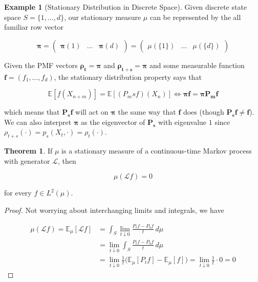 \documentclass{article}
\theoremstyle{definition}
\newtheorem{theorem}{Theorem}[section]
\newtheorem{example}{Example}[section]
\theoremstyle{remark}
\theoremstyle{definition}
\begin{document}
    \begin{example}[Stationary Distribution in Discrete Space]
      Given discrete state space $S = \{1, \ldots, d\}$, our stationary measure $\mu$ can be represented by the all familiar row vector 

        \[\boldsymbol{\pi} = \begin{pmatrix} \boldsymbol{\pi} (1) & \ldots & \boldsymbol{\pi} (d) \end{pmatrix} = \begin{pmatrix} \mu(\{1\}) & \ldots & \mu(\{d\}) \end{pmatrix}\] 

      Given the PMF vectors $\boldsymbol{\rho_t} = \boldsymbol{\pi}$ and $\boldsymbol{\rho_{t + s}} = \boldsymbol{\pi}$ and some measurable function $\mathbf{f} = (f_1, \ldots, f_d)$, the stationary distribution property says that 

        \[\mathbb{E}[f(X_{n + m})] = \mathbb{E}[(P_ms f)(X_n)] \iff \boldsymbol{\pi} \mathbf{f} = \boldsymbol{\pi} \mathbf{P_m} \mathbf{f}\]

      which means that $\mathbf{P_s} \mathbf{f}$ will act on $\boldsymbol{\pi}$ the same way that $\mathbf{f}$ does (though $\mathbf{P_s} \mathbf{f} \neq \mathbf{f}$). We can also interpret $\boldsymbol{\pi}$ as the eigenvector of $\mathbf{P_s}$ with eigenvalue $1$ since $\rho_{t + s} (\cdot) = p_s (X_t, \cdot) = \rho_t(\cdot)$. 
    \end{example}

    \begin{theorem}
      If $\mu$ is a stationary measure of a continuous-time Markov process with generator $\mathscr{L}$, then 

        \[\mu(\mathscr{L} f) = 0\]

      for every $f \in L^2 (\mu)$. 
    \end{theorem}
    \begin{proof}
    Not worrying about interchanging limits and integrals, we have 

    \begin{align*}
      \mu(\mathscr{L} f) = \mathbb{E}_\mu [\mathscr{L} f] & = \int_S \lim_{t \downarrow 0} \frac{P_t f - P_0 f}{t} \,d\mu \\ 
      & = \lim_{t \downarrow 0} \int_S \frac{P_t f - P_0 f}{t} \,d\mu \\
      & = \lim_{t \downarrow 0} \frac{1}{t} \big( \mathbb{E}_\mu [P_t f] - \mathbb{E}_\mu [f] \big) = \lim_{t \downarrow 0} \frac{1}{t} \cdot 0 = 0 
    \end{align*}
    \end{proof}
\end{document}
